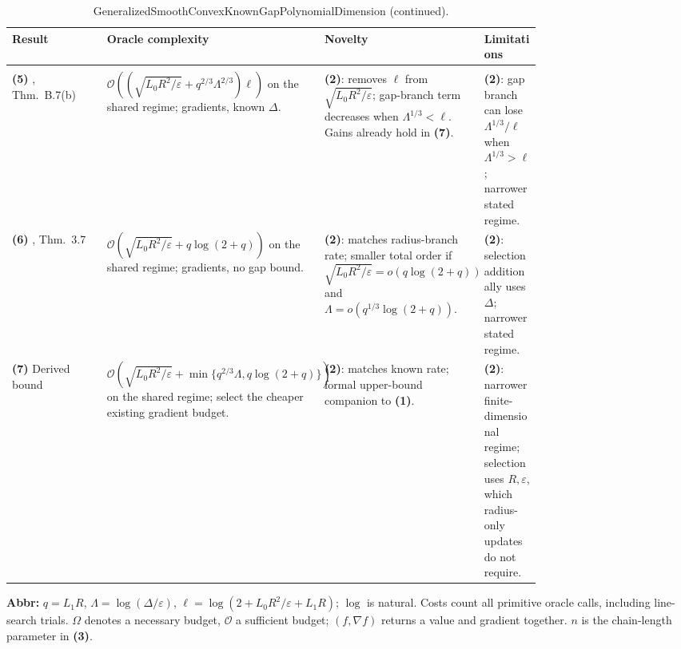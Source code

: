 \clearpage
\begin{table}[tp]
\centering
\caption{GeneralizedSmoothConvexKnownGapPolynomialDimension (continued).}
\begin{threeparttable}
\footnotesize
\setlength{\tabcolsep}{4pt}\renewcommand{\arraystretch}{1.25}
\begin{tabularx}{\linewidth}{@{}>{\raggedright\arraybackslash}p{0.20\linewidth}>{\raggedright\arraybackslash}p{0.32\linewidth}>{\raggedright\arraybackslash}p{0.25\linewidth}>{\raggedright\arraybackslash}X@{}}
\toprule
\textbf{Result} & \textbf{Oracle complexity} & \textbf{Novelty} & \textbf{Limitations} \\
\midrule
\multicolumn{4}{@{}l}{\textbf{Prior upper bounds: sufficient budgets}} \\
\midrule
\textbf{(5)} \citep{gapEverestI2026v2Verified}, Thm.~B.7(b) & $\mathcal{O}\!\left((\sqrt{L_0R^2/\varepsilon}+q^{2/3}\Lambda^{2/3})\ell\right)$ on the shared regime; gradients, known $\Delta$. & \textbf{(2)}: removes $\ell$ from $\sqrt{L_0R^2/\varepsilon}$; gap-branch term decreases when $\Lambda^{1/3}<\ell$. Gains already hold in \textbf{(7)}. & \textbf{(2)}: gap branch can lose $\Lambda^{1/3}/\ell$ when $\Lambda^{1/3}>\ell$; narrower stated regime. \\
\midrule
\textbf{(6)} \citep{gapEverestI2026v2Verified}, Thm.~3.7 & $\mathcal{O}\!\left(\sqrt{L_0R^2/\varepsilon}+q\log(2+q)\right)$ on the shared regime; gradients, no gap bound. & \textbf{(2)}: matches radius-branch rate; smaller total order if $\sqrt{L_0R^2/\varepsilon}=o(q\log(2+q))$ and $\Lambda=o(q^{1/3}\log(2+q))$. & \textbf{(2)}: selection additionally uses $\Delta$; narrower stated regime. \\
\midrule
\textbf{(7)} Derived bound \citep{kgAcceleratedRepositoryVerified,kgRadiusRepositoryVerified} & $\mathcal{O}\!\left(\sqrt{L_0R^2/\varepsilon}+\min\{q^{2/3}\Lambda,q\log(2+q)\}\right)$ on the shared regime; select the cheaper existing gradient budget. & \textbf{(2)}: matches known rate; formal upper-bound companion to \textbf{(1)}. & \textbf{(2)}: narrower finite-dimensional regime; selection uses $R,\varepsilon$, which radius-only updates do not require. \\
\bottomrule
\end{tabularx}
\begin{tablenotes}[flushleft]\footnotesize
\item[] \textbf{Abbr:} $q=L_1R$, $\Lambda=\log(\Delta/\varepsilon)$, $\ell=\log(2+L_0R^2/\varepsilon+L_1R)$; $\log$ is natural. Costs count all primitive oracle calls, including line-search trials. $\Omega$ denotes a necessary budget, $\mathcal{O}$ a sufficient budget; $(f,\nabla f)$ returns a value and gradient together. $n$ is the chain-length parameter in \textbf{(3)}.
\end{tablenotes}
\end{threeparttable}
\end{table}
\clearpage
